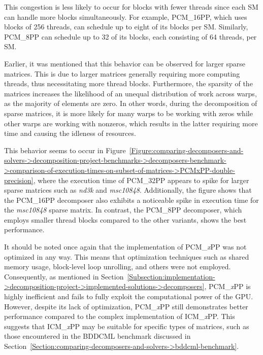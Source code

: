 This congestion is less likely to occur for blocks with fewer threads since each SM can handle more blocks simultaneously.
For example, PCM\_16PP, which uses blocks of 256 threads, can schedule up to eight of its blocks per SM.
Similarly, PCM\_8PP can schedule up to 32 of its blocks, each consisting of 64 threads, per SM.

Earlier, it was mentioned that this behavior can be observed for larger sparse matrices.
This is due to larger matrices generally requiring more computing threads, thus necessitating more thread blocks.
Furthermore, the sparsity of the matrices increases the likelihood of an unequal distribution of work across warps, as the majority of elements are zero.
In other words, during the decomposition of sparse matrices, it is more likely for many warps to be working with zeros while other warps are working with nonzeros, which results in the latter requiring more time and causing the idleness of resources.

This behavior seems to occur in Figure~\ref{Figure:comparing-decomposers-and-solvers->decomposition-project-benchmarks->decomposers-benchmark->comparison-of-execution-times-on-subset-of-matrices->PCMxPP-double-precision}, where the execution time of PCM\_32PP appears to spike for larger sparse matrices such as \textit{nd3k} and \textit{msc10848}.
Additionally, the figure shows that the PCM\_16PP decomposer also exhibits a noticeable spike in execution time for the \textit{msc10848} sparse matrix.
In contrast, the PCM\_8PP decomposer, which employs smaller thread blocks compared to the other variants, shows the best performance.

It should be noted once again that the implementation of PCM\_\textit{x}PP was not optimized in any way.
This means that optimization techniques such as shared memory usage, block-level loop unrolling, and others were not employed.
Consequently, as mentioned in Section~\ref{Subsection:implementation->decomposition-project->implemented-solutions->decomposers}, PCM\_\textit{x}PP is highly inefficient and fails to fully exploit the computational power of the GPU.
However, despite its lack of optimization, PCM\_\textit{x}PP still demonstrates better performance compared to the complex implementation of ICM\_\textit{x}PP.
This suggests that ICM\_\textit{x}PP may be suitable for specific types of matrices, such as those encountered in the BDDCML benchmark discussed in Section~\ref{Section:comparing-decomposers-and-solvers->bddcml-benchmark}.

